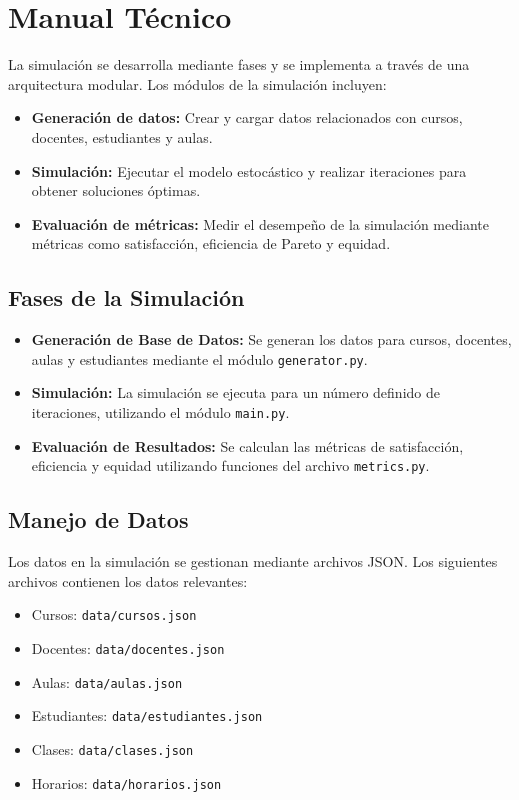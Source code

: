 \documentclass{article}
\begin{document}
\section{Manual Técnico}\label{sec:man_t}

La simulación se desarrolla mediante fases y se implementa a través de una 
arquitectura modular. Los módulos de la simulación incluyen:

\begin{itemize}
    \item \textbf{Generación de datos:} Crear y cargar datos relacionados con cursos, 
          docentes, estudiantes y aulas.
    \item \textbf{Simulación:} Ejecutar el modelo estocástico y realizar iteraciones para 
          obtener soluciones óptimas.
    \item \textbf{Evaluación de métricas:} Medir el desempeño de la simulación mediante 
          métricas como satisfacción, eficiencia de Pareto y equidad.
\end{itemize}

\subsection{Fases de la Simulación}

\begin{itemize}
    \item \textbf{Generación de Base de Datos:} Se generan los datos para cursos, docentes, 
          aulas y estudiantes mediante el módulo \texttt{generator.py}.
    \item \textbf{Simulación:} La simulación se ejecuta para un número definido de 
          iteraciones, utilizando el módulo \texttt{main.py}.
    \item \textbf{Evaluación de Resultados:} Se calculan las métricas de satisfacción, 
          eficiencia y equidad utilizando funciones del archivo \texttt{metrics.py}.
\end{itemize}

\subsection{Manejo de Datos}
Los datos en la simulación se gestionan mediante archivos JSON. Los siguientes archivos 
contienen los datos relevantes:

\begin{itemize}
    \item Cursos: \texttt{data/cursos.json}
    \item Docentes: \texttt{data/docentes.json}
    \item Aulas: \texttt{data/aulas.json}
    \item Estudiantes: \texttt{data/estudiantes.json}
    \item Clases: \texttt{data/clases.json}
    \item Horarios: \texttt{data/horarios.json}
\end{itemize}
\end{document}
